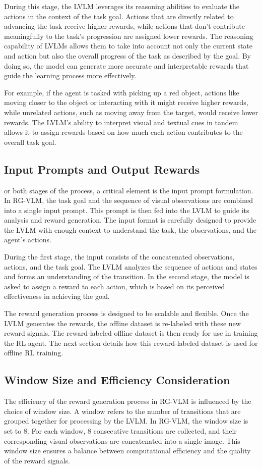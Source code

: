 \documentclass[master,english,final]{kaist-ucs}
\begin{document}
During this stage, the LVLM leverages its reasoning abilities to evaluate the actions in the context of the task goal. Actions that are directly related to advancing the task receive higher rewards, while actions that don’t contribute meaningfully to the task’s progression are assigned lower rewards. The reasoning capability of LVLMs allows them to take into account not only the current state and action but also the overall progress of the task as described by the goal. By doing so, the model can generate more accurate and interpretable rewards that guide the learning process more effectively.

For example, if the agent is tasked with picking up a red object, actions like moving closer to the object or interacting with it might receive higher rewards, while unrelated actions, such as moving away from the target, would receive lower rewards. The LVLM’s ability to interpret visual and textual cues in tandem allows it to assign rewards based on how much each action contributes to the overall task goal.

\subsection{Input Prompts and Output Rewards}
or both stages of the process, a critical element is the input prompt formulation. In RG-VLM, the task goal and the sequence of visual observations are combined into a single input prompt. This prompt is then fed into the LVLM to guide its analysis and reward generation. The input format is carefully designed to provide the LVLM with enough context to understand the task, the observations, and the agent’s actions.

During the first stage, the input consists of the concatenated observations, actions, and the task goal. The LVLM analyzes the sequence of actions and states and forms an understanding of the transition. In the second stage, the model is asked to assign a reward to each action, which is based on its perceived effectiveness in achieving the goal.

The reward generation process is designed to be scalable and flexible. Once the LVLM generates the rewards, the offline dataset is re-labeled with these new reward signals. The reward-labeled offline dataset is then ready for use in training the RL agent. The next section details how this reward-labeled dataset is used for offline RL training.

\subsection{Window Size and Efficiency Consideration}
The efficiency of the reward generation process in RG-VLM is influenced by the choice of window size. A window refers to the number of transitions that are grouped together for processing by the LVLM. In RG-VLM, the window size is set to 8. For each window, 8 consecutive transitions are collected, and their corresponding visual observations are concatenated into a single image. This window size ensures a balance between computational efficiency and the quality of the reward signals.
\end{document}
